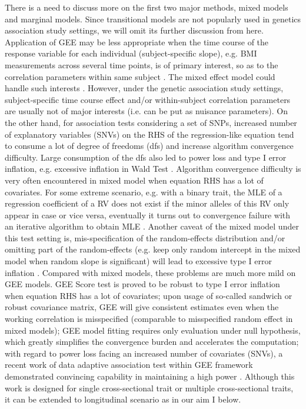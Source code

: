 \documentclass[12pt]{article}
\begin{document}
There is a need to discuss more on the first two major methods, mixed models and marginal models. Since transitional models are not popularly used in genetics association study settings, we will omit its further discussion from here. Application of GEE may be less appropriate when the time course of the response variable for each individual (subject-specific slope), e.g. BMI measurements across several time points, is of primary interest, so as to the correlation parameters within same subject \cite{zeger1988models,liang1986longitudinal}. The mixed effect model could handle such interests \cite{laird1982random}. However, under the genetic association study settings, subject-specific time course effect and/or within-subject correlation parameters are usually not of major interests (i.e. can be put as nuisance parameters). On the other hand, for association tests considering a set of SNPs, increased number of explanatory variables (SNVs) on the RHS of the regression-like equation tend to consume a lot of degree of freedoms (dfs) and increase algorithm convergence difficulty. Large consumption of the dfs also led to power loss and type I error inflation, e.g. excessive inflation in Wald Test \cite{guo2005small,pan2001robust,shete2004effect}. Algorithm convergence difficulty is very often encountered in mixed model when equation RHS has a lot of covariates. For some extreme scenario, e.g. with a binary trait, the MLE of a regression coefficient of a RV does not exist if the minor alleles of this RV only appear in case or vice versa, eventually it turns out to convergence failure with an iterative algorithm to obtain MLE \cite{zhang2014testing,pan2014powerful}. Another caveat of the mixed model under this test setting is, mis-specification of the random-effects distribution and/or omitting part of the random-effects (e.g. keep only random intercept in the mixed model when random slope is significant) will lead to excessive type I error inflation \cite{litiere2007type,Xu2014}. Compared with mixed models, these problems are much more mild on GEE models. GEE Score test is proved to be robust to type I error inflation when equation RHS has a lot of covariates; upon usage of so-called sandwich or robust covariance matrix, GEE will give consistent estimates even when the working correlation is misspecified (comparable to misspecified random effect in mixed models); GEE model fitting requires only evaluation under null hypothesis, which greatly simplifies the convergence burden and accelerates the computation; with regard to power loss facing an increased number of covariates (SNVs), a recent work of data adaptive association test within GEE framework demonstrated convincing capability in maintaining a high power \cite{zhang2014testing,pan2014powerful}. Although this work is designed for single cross-sectional trait or multiple cross-sectional traits, it can be extended to longitudinal scenario as in our aim I below. 
\end{document}
